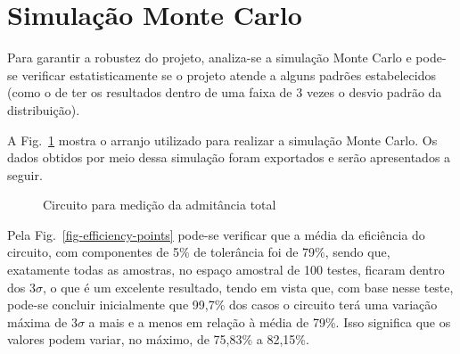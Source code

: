 \documentclass[
  number,
  preprint]{elsarticle}
\begin{document}
\section{Simulação Monte Carlo}\label{simulauxe7uxe3o-monte-carlo}

Para garantir a robustez do projeto, analiza-se a simulação Monte Carlo
e pode-se verificar estatisticamente se o projeto atende a alguns
padrões estabelecidos (como o de ter os resultados dentro de uma faixa
de 3 vezes o desvio padrão da distribuição).

A Fig.~\ref{fig-monte-carlo} mostra o arranjo utilizado para realizar a
simulação Monte Carlo. Os dados obtidos por meio dessa simulação foram
exportados e serão apresentados a seguir.

\begin{figure}


\caption{\label{fig-monte-carlo}Circuito para medição da admitância
total}

\end{figure}%

Pela Fig.~\ref{fig-efficiency-points} pode-se verificar que a média da
eficiência do circuito, com componentes de 5\% de tolerância foi de
79\%, sendo que, exatamente todas as amostras, no espaço amostral de 100
testes, ficaram dentro dos 3\(\sigma\), o que é um excelente resultado,
tendo em vista que, com base nesse teste, pode-se concluir inicialmente
que 99,7\% dos casos o circuito terá uma variação máxima de 3\(\sigma\)
a mais e a menos em relação à média de 79\%. Isso significa que os
valores podem variar, no máximo, de 75,83\% a 82,15\%.
\end{document}
